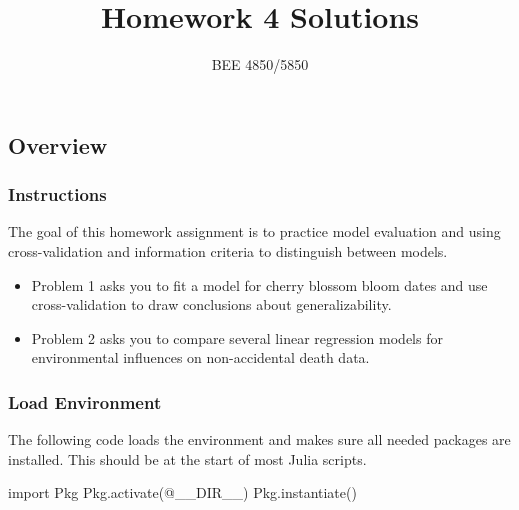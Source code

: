 \documentclass[
  letterpaper,
  DIV=11,
  numbers=noendperiod]{scrartcl}
\title{Homework 4 Solutions}
\subtitle{BEE 4850/5850}
\author{}
\date{}
\newenvironment{Shaded}{\begin{snugshade}}{\end{snugshade}}
\newcommand{\BuiltInTok}[1]{\textcolor[rgb]{0.00,0.23,0.31}{#1}}
\newcommand{\FunctionTok}[1]{\textcolor[rgb]{0.28,0.35,0.67}{#1}}
\newcommand{\ImportTok}[1]{\textcolor[rgb]{0.00,0.46,0.62}{#1}}
\newcommand{\NormalTok}[1]{\textcolor[rgb]{0.00,0.23,0.31}{#1}}
\newcommand{\PreprocessorTok}[1]{\textcolor[rgb]{0.68,0.00,0.00}{#1}}
\providecommand{\tightlist}{%
  \setlength{\itemsep}{0pt}\setlength{\parskip}{0pt}}
\begin{document}
\maketitle



\subsection{Overview}\label{overview}

\subsubsection{Instructions}\label{instructions}

The goal of this homework assignment is to practice model evaluation and
using cross-validation and information criteria to distinguish between
models.

\begin{itemize}
\tightlist
\item
  Problem 1 asks you to fit a model for cherry blossom bloom dates and
  use cross-validation to draw conclusions about generalizability.
\item
  Problem 2 asks you to compare several linear regression models for
  environmental influences on non-accidental death data.
\end{itemize}

\subsubsection{Load Environment}\label{load-environment}

The following code loads the environment and makes sure all needed
packages are installed. This should be at the start of most Julia
scripts.

\begin{Shaded}
\begin{Highlighting}[]
\ImportTok{import} \BuiltInTok{Pkg}
\BuiltInTok{Pkg}\NormalTok{.}\FunctionTok{activate}\NormalTok{(}\PreprocessorTok{@\_\_DIR\_\_}\NormalTok{)}
\BuiltInTok{Pkg}\NormalTok{.}\FunctionTok{instantiate}\NormalTok{()}
\end{Highlighting}
\end{Shaded}
\end{document}
